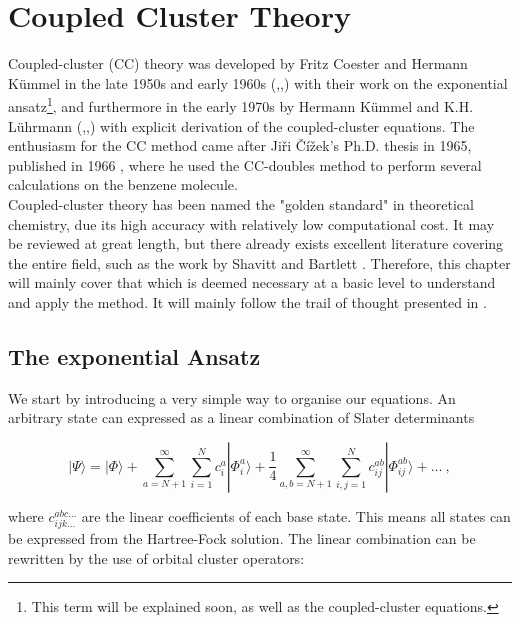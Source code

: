 	\chapter{Coupled Cluster Theory}
	
	Coupled-cluster (CC) theory was developed by Fritz Coester and Hermann K\"ummel in the late 1950s and early 1960s (\cite{Coester58},\cite{CoesterKummel60},\cite{Kummel62}) with their work on the exponential ansatz\footnote{This term will be explained soon, as well as the coupled-cluster equations.}, and furthermore in the early 1970s by Hermann K\"ummel and K.H. L\"uhrmann (\cite{Kummel71},\cite{KummeLuhrmann72},\cite{KummeLuhrmann72_2}) with explicit derivation of the coupled-cluster equations. The enthusiasm for the CC method came after Ji\v{r}i \v{C}\'{i}\v{z}ek's Ph.D. thesis in 1965, published in 1966 \cite{Cizek66}, where he used the CC-doubles method to perform several calculations on the benzene molecule.\\
	
	Coupled-cluster theory has been named the "golden standard" in theoretical chemistry, due its high accuracy with relatively low computational cost. It may be reviewed at great length, but there already exists excellent literature covering the entire field, such as the work by Shavitt and Bartlett \cite{ShavittBartlett09}. Therefore, this chapter will mainly cover that which is deemed necessary at a basic level to understand and apply the method. It will mainly follow the trail of thought presented in \cite{ShavittBartlett09}.
	
	
	\section{The exponential Ansatz}
	We start by introducing a very simple way to organise our equations. An arbitrary state can expressed as a linear combination of Slater determinants
	
	\begin{equation}
		|\Psi\rangle = |\Phi\rangle + \sum_{a=N+1}^\infty\sum_{i=1}^Nc_i^a|\Phi_i^a\rangle + \frac{1}{4}\sum_{a,b=N+1}^\infty\sum_{i,j=1}^Nc_{ij}^{ab}|\Phi_{ij}^{ab}\rangle +\ldots \:,
		\label{EQ 3.1 general WF}
	\end{equation}
	
	\noindent where $c_{ijk\ldots}^{abc\ldots}$ are the linear coefficients of each base state. This means all states can be expressed from the Hartree-Fock solution. The linear combination can be rewritten by the use of orbital cluster operators:
	
